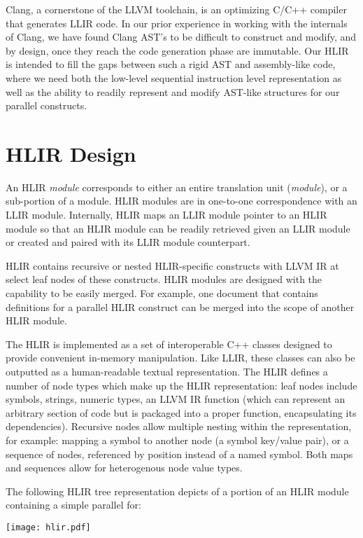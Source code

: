 \documentclass[12pt]{article}
\begin{document}
Clang, a cornerstone of the LLVM toolchain, is an optimizing C/C++ compiler that generates LLIR code. In our prior experience in working with the internals of Clang, we have found Clang AST's to be difficult to construct and modify, and by design, once they reach the code generation phase are immutable. Our HLIR is intended to fill the gaps between such a rigid AST and assembly-like code, where we need both the low-level sequential instruction level representation as well as the ability to readily represent and modify AST-like structures for our parallel constructs.

\section{HLIR Design}

An HLIR {\it module} corresponds to either an entire translation unit ({\it module}), or a sub-portion of a module. HLIR modules are in one-to-one correspondence with an LLIR module. Internally, HLIR maps an LLIR module pointer to an HLIR module so that an HLIR module can be readily retrieved given an LLIR module or created and paired with its LLIR module counterpart.

HLIR contains recursive or nested HLIR-specific constructs with LLVM IR at select leaf nodes of these constructs. HLIR modules are designed with the capability to be easily merged. For example, one document that contains definitions for a parallel HLIR construct can be merged into the scope of another HLIR module.

The HLIR is implemented as a set of interoperable C++ classes designed to provide convenient in-memory manipulation. Like LLIR, these classes can also be outputted as a human-readable textual representation. The HLIR defines a number of node types which make up the HLIR representation: leaf nodes include symbols, strings, numeric types, an LLVM IR function (which can represent an arbitrary section of code but is packaged into a proper function, encapsulating its dependencies). Recursive nodes allow multiple nesting within the representation, for example: mapping a symbol to another node (a symbol key/value pair), or a sequence of nodes, referenced by position
instead of a named symbol. Both maps and sequences allow for heterogenous node value types.

The following HLIR tree representation depicts of a portion of an HLIR module containing a simple parallel for:

\texttt{[image: hlir.pdf]}
\end{document}
